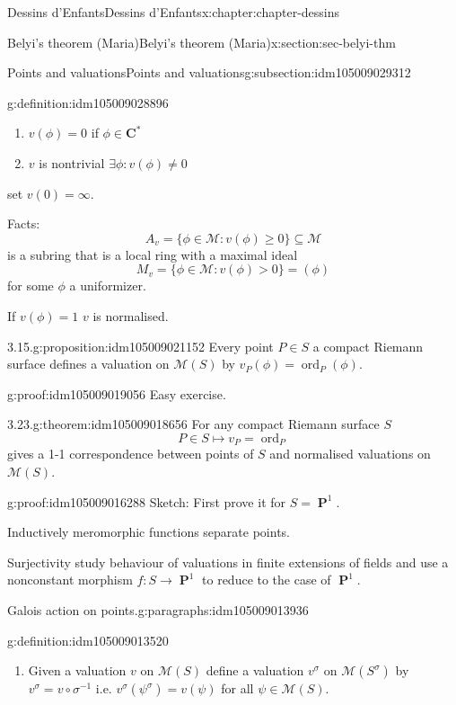 \documentclass[oneside,10pt,]{book}
\numberwithin{equation}{section}
\newcommand{\CC}{\mathbf{C}}
\DeclareMathOperator{\ord}{ord}
\DeclareMathOperator{\PP}{\mathbf{P}}
\newcommand{\gt}{>}
\begin{document}
\begin{chapterptx}{Dessins d'Enfants}{}{Dessins d'Enfants}{}{}{x:chapter:chapter-dessins}
\begin{sectionptx}{Belyi's theorem (Maria)}{}{Belyi's theorem (Maria)}{}{}{x:section:sec-belyi-thm}
\begin{subsectionptx}{Points and valuations}{}{Points and valuations}{}{}{g:subsection:idm105009029312}
\begin{definition}{}{g:definition:idm105009028896}
\begin{enumerate}
\item{}\(v(\phi) = 0 \) if \(\phi \in \CC^*\)%
\item{}\(v\) is nontrivial \(\exists \phi : v(\phi)\ne 0\)%
\end{enumerate}
set \(v(0) = \infty\).%
\end{definition}
Facts:%
\begin{equation*}
A_v = \{\phi \in \mathcal M : v(\phi) \ge 0 \} \subseteq \mathcal M
\end{equation*}
is a subring that is a local ring with a maximal ideal%
\begin{equation*}
M_v = \{ \phi\in \mathcal M : v(\phi) \gt 0\} = (\phi)
\end{equation*}
for some \(\phi\) a uniformizer.%
\par
If \(v(\phi) = 1\) \(v\) is normalised.%
\begin{proposition}{3.15.}{}{g:proposition:idm105009021152}%
Every point \(P \in S\) a compact Riemann surface defines a valuation on \(\mathcal M(S)\) by \(v_P(\phi) = \ord_P(\phi)\).%
\end{proposition}
\begin{proofptx}{}{g:proof:idm105009019056}
Easy exercise.%
\end{proofptx}
\begin{theorem}{3.23.}{}{g:theorem:idm105009018656}%
For any compact Riemann surface \(S\)%
\begin{equation*}
P\in S \mapsto v_P = \ord_P
\end{equation*}
gives a 1-1 correspondence between points of \(S\) and normalised valuations on \(\mathcal M(S)\).%
\end{theorem}
\begin{proofptx}{}{g:proof:idm105009016288}
Sketch: First prove it for \(S = \PP^1\).%
\par
Inductively meromorphic functions separate points.%
\par
Surjectivity study behaviour of valuations in finite extensions of fields and use a nonconstant morphism \(f\colon S \to \PP^1\) to reduce to the case of \(\PP^1\).%
\end{proofptx}
\begin{paragraphs}{Galois action on points.}{g:paragraphs:idm105009013936}%
\begin{definition}{}{g:definition:idm105009013520}%
%
\begin{enumerate}
\item{}Given a valuation \(v\) on \(\mathcal M(S)\) define a valuation \(v^\sigma\) on \(\mathcal M(S^\sigma)\) by \(v^\sigma = v\circ \sigma^{-1}\) i.e. \(v^\sigma(\psi^\sigma) = v(\psi)\) for all \(\psi \in \mathcal M(S)\).%

\end{enumerate}
\end{definition}
\end{paragraphs}
\end{subsectionptx}
\end{sectionptx}
\end{chapterptx}
\end{document}
